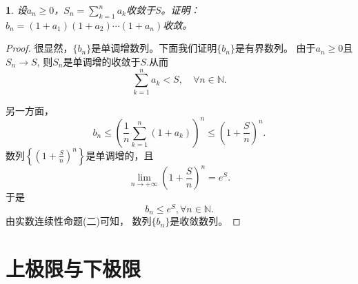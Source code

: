 \documentclass[utf8]{book}
\newtheorem{example}{}[section]             %
\begin{document}
\begin{example}
设$a_n\geq 0$，$S_n=\displaystyle\sum_{k=1}^na_k$收敛于$S$。证明：$b_n=(1+a_1)(1+a_2)\cdots(1+a_n)$收敛。
\end{example}
\begin{proof}很显然，$\{b_n\}$是单调增数列。下面我们证明$\{b_n\}$是有界数列。
由于$a_n\geq 0$且$S_n\rightarrow S$, 则$S_n$是单调增的收敛于$S$.从而$$\displaystyle\sum_{k=1}^na_k < S,\quad\forall n\in \mathbb{N}.$$

另一方面，
$$b_n\leq \left(\frac{1}{n}\displaystyle\sum_{k=1}^n(1+a_k)\right)^n\leq \left(1+\frac{S}{n}\right)^n.$$
数列$\left\{\left(1+\displaystyle\frac{S}{n}\right)^n\right\}$是单调增的，且$$\displaystyle  \lim_{n\to +\infty}\left(1+\frac{S}{n}\right)^n=e^{S}.$$
于是
$$b_n \leq e^{S}, \forall n\in\mathbb{N}.$$
由实数连续性命题(二)可知， 数列$\{b_n\}$是收敛数列。
\end{proof}
\section{上极限与下极限}
\end{document}
